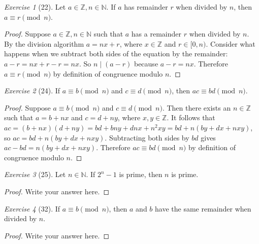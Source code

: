 \documentclass[12pt]{amsart}
\theoremstyle{remark}
\newtheorem*{exercise}{Exercise}%
\def\NN{\ensuremath{\mathbb N}}
\def\ZZ{\ensuremath{\mathbb Z}}
\theoremstyle{mycomment}
\begin{document}
\begin{exercise}[22] Let $a\in\ZZ, n\in\NN$. If $a$ has remainder $r$ when divided by $n$, then $a\equiv r\pmod n$.
\begin{proof}
	Suppose $a\in\ZZ, n\in\NN$ such that $a$ has a remainder $r$ when divided by $n$. By the division algorithm $a = nx + r$, where $x \in \ZZ$ and $r \in [ 0,n )$. Consider what happens when we subtract both sides of the equation by the remainder: $a - r = nx + r - r = nx$. So $n \mid (a - r)$ because $a - r = nx$. Therefore $a \equiv r \pmod{n}$ by definition of congruence modulo $n$.
\end{proof}
\end{exercise}

\begin{exercise}[24] If $a\equiv b\pmod n$ and $c\equiv d\pmod n$, then $ac\equiv bd\pmod n$. 
\begin{proof}
	Suppose $a \equiv b\pmod n$ and $c \equiv d\pmod n$. Then there exists an $n \in \ZZ$ such that $a = b + nx$ and $c = d + ny$, where $x,y\in\ZZ$. It follows that $ac = (b+nx)(d + ny) = bd + bny +dnx + n^2xy = bd + n(by + dx + nxy)$, so $ac = bd + n(by + dx + nxy)$. Subtracting both sides by $bd$ gives $ac - bd = n(by + dx + nxy)$. Therefore $ac \equiv bd \pmod{n}$ by definition of congruence modulo $n$.
\end{proof}
\end{exercise}


\begin{exercise}[25] Let $n\in\NN$. If $2^{n}-1$ is prime, then $n$ is prime.
\begin{proof}
Write your answer here.
\end{proof}
\end{exercise}

\begin{exercise}[32] If $a\equiv b\pmod n$, then $a$ and $b$ have the same remainder when divided by $n$.
\begin{proof}
Write your answer here.
\end{proof}
\end{exercise}





 
\end{document}
